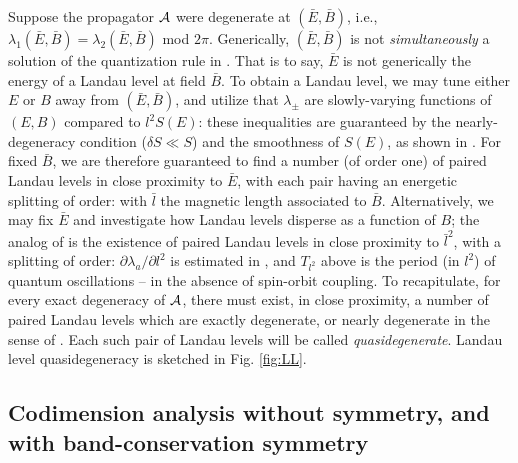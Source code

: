\documentclass[aps, prb, showpacs, twocolumn, notitlepage, superscriptaddress]{revtex4-1}
\begin{document}
Suppose the propagator ${\cal A}$ were degenerate at $(\bar{E},\bar{B})$, i.e., $\lambda_1(\bar{E},\bar{B})=\lambda_2(\bar{E},\bar{B})$ mod $2\pi$. Generically, $(\bar{E},\bar{B})$ is not \emph{simultaneously} a solution of the quantization rule in . That is to say, $\bar{E}$ is not generically the energy of a Landau level at field $\bar{B}$. To obtain a Landau level, we may tune either $E$ or $B$   away from $(\bar{E},\bar{B})$, and  utilize that  $\lambda_{\pm}$ are slowly-varying functions of $(E,B)$ compared to $l^2S(E)$:
these inequalities are guaranteed by the nearly-degeneracy condition ($\delta S{\ll}S$) and the smoothness of $S(E)$, as shown in .  For fixed $\bar{B}$, we are therefore guaranteed to find a number (of order one) of paired Landau levels  in close proximity to $\bar{E}$, with each pair having an energetic splitting of order:
with $\bar{l}$ the magnetic length associated to $\bar{B}$. Alternatively, we may fix $\bar{E}$ and investigate how Landau levels disperse as a function of $B$; the analog of   is the existence of paired Landau levels in close proximity to $\bar{l}^2$, with a splitting of order:
$\partial \lambda_a/\partial l^2$ is estimated in , and
$T_{l^2}$ above is the period (in $l^2$) of quantum oscillations -- in the absence of spin-orbit coupling. To recapitulate, for every exact degeneracy of ${\cal A}$, there must exist, in close proximity, a number of paired Landau levels which are exactly degenerate, or nearly degenerate in the sense of . Each such pair of Landau levels will be called \textit{quasidegenerate}. Landau level quasidegeneracy is sketched in Fig. \ref{fig:LL}.

\subsection{Codimension analysis without symmetry, and with band-conservation symmetry}\label{sec:introducecodimension}
\end{document}
